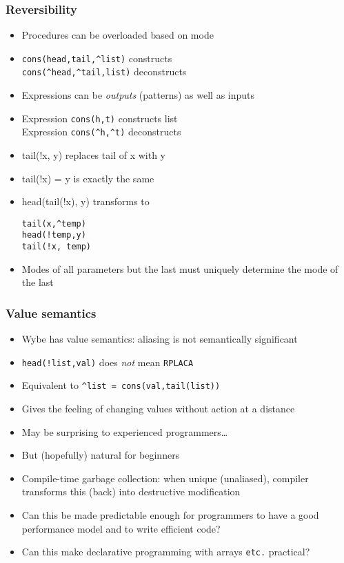 \documentclass[12pt]{beamer}
\begin{document}
\begin{frame}
\frametitle{Reversibility}
\begin{itemize}
\item Procedures can be overloaded based on mode
\item \texttt{cons(head,tail,\^{ }list)}  constructs \\
\texttt{cons(\^{ }head,\^{ }tail,list)}  deconstructs \\
\item Expressions can be \emph{outputs} (patterns) as well as inputs
\item Expression \texttt{cons(h,t)} constructs list \\
Expression \texttt{cons(\^{ }h,\^{ }t)} deconstructs
\item tail(!x, y) replaces tail of x with y
\item tail(!x) = y is exactly the same
\item head(tail(!x), y) \quad transforms to \quad
  \begin{minipage}[c]{0.4\linewidth}
  \texttt{tail(x,\^{ }temp)} \\
  \texttt{head(!temp,y)} \\
  \texttt{tail(!x, temp)}
  \end{minipage}
\item Modes of all parameters but the last must uniquely determine the
  mode of the last
\end{itemize}
\end{frame}


\begin{frame}
\frametitle{Value semantics}
\begin{itemize}
\item Wybe has value semantics:  aliasing is not semantically significant
\item \texttt{head(!list,val)} does \emph{not} mean \texttt{RPLACA}
\item Equivalent to \texttt{\^{ }list = cons(val,tail(list))}
\item Gives the feeling of changing values without action at a distance
\item May be surprising to experienced programmers\ldots
\item But (hopefully) natural for beginners
\item Compile-time garbage collection:  when unique (unaliased),
  compiler transforms this (back) into destructive modification
\item Can this be made predictable enough for programmers
  to have a good performance model and to write efficient code?
\item Can this make declarative programming with arrays \texttt{etc.} practical?
\end{itemize}
\end{frame}
\end{document}

